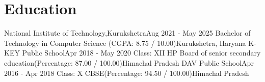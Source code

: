 \section{Education}
\resumeSubHeadingListStart
\resumeSubheading
{National Institute of Technology,Kurukshetra}{Aug 2021 - May 2025}
{Bachelor of Technology in Computer Science (CGPA: 8.75 / 10.00)}{Kurukshetra, Haryana}
\resumeSubheading
{K-KEY Public School}{Apr 2018 - May 2020}
{Class: XII HP Board of senior secondary education(Percentage: 87.00 / 100.00)}{Himachal Pradesh}
\resumeSubheading
{DAV Public School}{Apr 2016 - Apr 2018}
{Class: X CBSE(Percentage: 94.50 / 100.00)}{Himachal Pradesh}

\resumeSubHeadingListEnd
